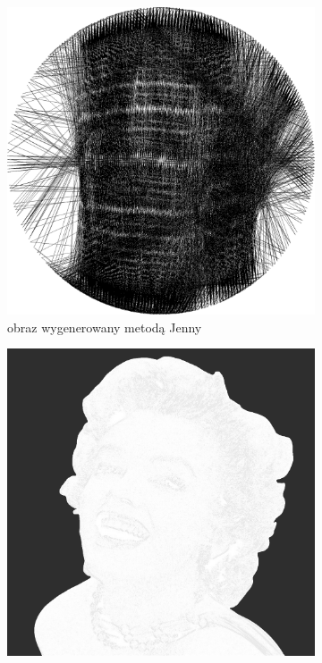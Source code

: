 \documentclass[a4paper, 12pt, polish, twoside]{extreport}
\begin{document}
\begin{figure}[H]
\begin{subfigure}{0.40\textwidth}
        \includegraphics[width = \textwidth]{img/6-comp/monroe-portrait_jenny_1561W-1P-300N-2000.png}
        \caption{obraz wygenerowany metodą Jenny}
        \label{comp-comp-monroe-b}
    \end{subfigure}
    \begin{subfigure}{0.40\textwidth}
        \centering
        \includegraphics[width = \textwidth]{img/6-comp/monroe-portrait_mask_c20_inv0_bg10_obj1_ed1.png}

\end{subfigure}
\end{figure}
\end{document}
